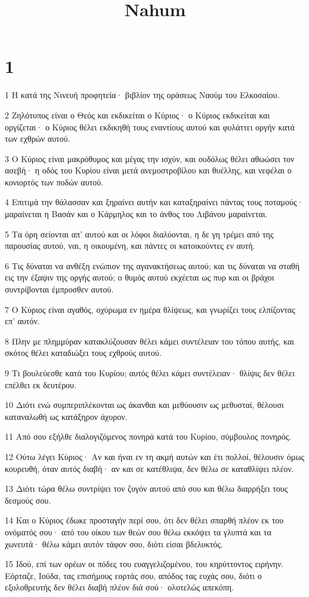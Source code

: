 

\title{Nahum}


\chapter{1}

\par 1 Η κατά της Νινευή προφητεία· βιβλίον της οράσεως Ναούμ του Ελκοσαίου.
\par 2 Ζηλότυπος είναι ο Θεός και εκδικείται ο Κύριος· ο Κύριος εκδικείται και οργίζεται· ο Κύριος θέλει εκδικηθή τους εναντίους αυτού και φυλάττει οργήν κατά των εχθρών αυτού.
\par 3 Ο Κύριος είναι μακρόθυμος και μέγας την ισχύν, και ουδόλως θέλει αθωώσει τον ασεβή· η οδός του Κυρίου είναι μετά ανεμοστροβίλου και θυέλλης, και νεφέλαι ο κονιορτός των ποδών αυτού.
\par 4 Επιτιμά την θάλασσαν και ξηραίνει αυτήν και καταξηραίνει πάντας τους ποταμούς· μαραίνεται η Βασάν και ο Κάρμηλος και το άνθος του Λιβάνου μαραίνεται.
\par 5 Τα όρη σείονται απ' αυτού και οι λόφοι διαλύονται, η δε γη τρέμει από της παρουσίας αυτού, ναι, η οικουμένη, και πάντες οι κατοικούντες εν αυτή.
\par 6 Τις δύναται να ανθέξη ενώπιον της αγανακτήσεως αυτού; και τις δύναται να σταθή εις την έξαψιν της οργής αυτού; ο θυμός αυτού εκχέεται ως πυρ και οι βράχοι συντρίβονται έμπροσθεν αυτού.
\par 7 Ο Κύριος είναι αγαθός, οχύρωμα εν ημέρα θλίψεως, και γνωρίζει τους ελπίζοντας επ' αυτόν.
\par 8 Πλην με πλημμύραν κατακλύζουσαν θέλει κάμει συντέλειαν του τόπου αυτής, και σκότος θέλει καταδιώξει τους εχθρούς αυτού.
\par 9 Τι βουλεύεσθε κατά του Κυρίου; αυτός θέλει κάμει συντέλειαν· θλίψις δεν θέλει επέλθει εκ δευτέρου.
\par 10 Διότι ενώ συμπεριπλέκονται ως άκανθαι και μεθύουσιν ως μεθυσταί, θέλουσι καταναλωθή ως κατάξηρον άχυρον.
\par 11 Από σου εξήλθε διαλογιζόμενος πονηρά κατά του Κυρίου, σύμβουλος πονηρός.
\par 12 Ούτω λέγει Κύριος· Αν και ήναι εν τη ακμή αυτών και έτι πολλοί, θέλουσιν όμως κουρευθή, όταν αυτός διαβή· αν και σε κατέθλιψα, δεν θέλω σε καταθλίψει πλέον.
\par 13 Διότι τώρα θέλω συντρίψει τον ζυγόν αυτού από σου και θέλω διαρρήξει τους δεσμούς σου.
\par 14 Και ο Κύριος έδωκε προσταγήν περί σου, ότι δεν θέλει σπαρθή πλέον εκ του ονόματός σου· από του οίκου των θεών σου θέλω εκκόψει τα γλυπτά και τα χωνευτά· θέλω κάμει αυτόν τάφον σου, διότι είσαι βδελυκτός.
\par 15 Ιδού, επί των ορέων οι πόδες του ευαγγελιζομένου, του κηρύττοντος ειρήνην. Εόρταζε, Ιούδα, τας επισήμους εορτάς σου, απόδος τας ευχάς σου, διότι ο εξολοθρευτής δεν θέλει διαβή πλέον διά σού· ολοτελώς απεκόπη.


